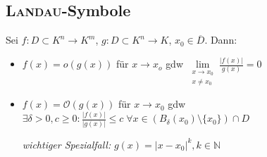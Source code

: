 \subsection*{\textsc{Landau}-Symbole}
Sei $f:D\subset K^n \to K^m$, $g:D\subset K^n \to K$, $x_0 \in \overline{D}$. Dann:
\begin{itemize}
	\item $f(x) = o(g(x))$ für $x\to x_o$ \gls{gdw} $\lim\limits_{\substack{x\to x_0 \\ x\neq x_0}} \frac{\vert f(x) \vert}{g(x)} = 0$
	\item $f(x) = \mathcal{O}(g(x))$ für $x\to x_0$ \gls{gdw} $\exists \delta > 0, c \ge 0: \frac{\vert f(x) \vert}{\vert g(x) \vert} \le c \;\forall x\in \left( B_\delta(x_0)\setminus \{ x_0\}\right) \cap D$
	
	\emph{wichtiger Spezialfall:} $g(x) = \vert x - x_0\vert ^k, k\in\mathbb{N}$
\end{itemize}


